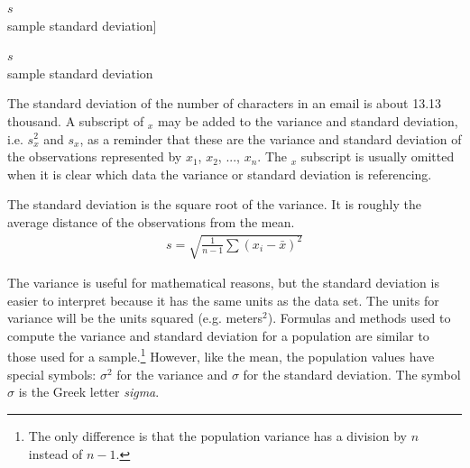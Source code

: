 $s$\\\footnotesize sample standard deviation]{\raggedright\vspace{-10mm}

$s$\\\footnotesize sample standard deviation
}The standard deviation of the number of characters in an email is about 13.13 thousand. A subscript of $_x$ may be added to the variance and standard deviation, i.e. $s_x^2$ and $s_x^{}$, as a reminder that these are the variance and standard deviation of the observations represented by $x_1^{}$, $x_2^{}$, ..., $x_n^{}$. The $_{x}$ subscript is usually omitted when it is clear which data the variance or standard deviation is referencing.


\begin{termBox}{
The standard deviation is the square root of the variance. It is roughly the average distance of the observations from the mean.
\begin{eqnarray}
\label{sdEquation}
s = \sqrt{\frac{1}{n-1} \sum{(x_i -  \bar{x})^2}}
\end{eqnarray}
}
\end{termBox}

The variance is useful for mathematical reasons, but the standard deviation is easier to interpret because it has the same units as the data set. The units for variance will be the units squared (e.g. meters$^2$).
Formulas and methods used to compute the variance and standard deviation for a population are similar to those used for a sample.\footnote{The only difference is that the population variance has a division by $n$ instead of $n-1$.} However, like the mean, the population values have special symbols: $\sigma_{}^2$ for the variance and $\sigma$ for the standard deviation. The symbol $\sigma$  is the Greek letter \emph{sigma}.

